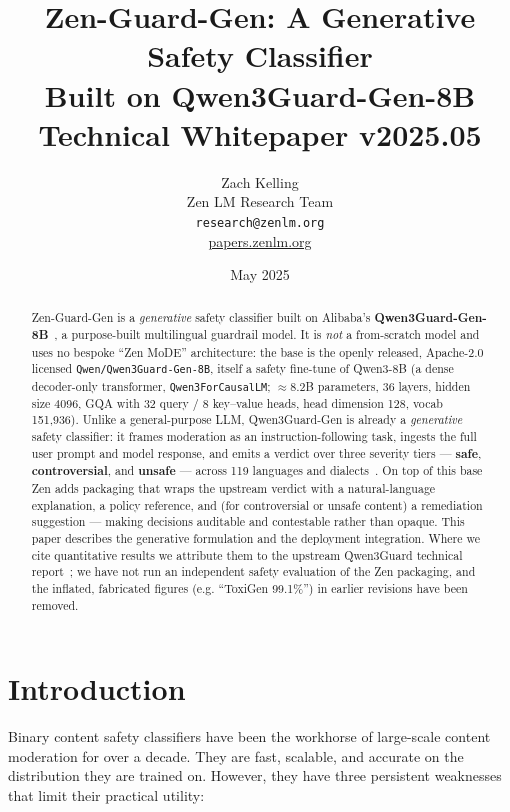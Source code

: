 \documentclass[11pt,a4paper]{article}
\title{\textbf{Zen-Guard-Gen: A Generative Safety Classifier\\
Built on Qwen3Guard-Gen-8B}\\[0.5em]
\large Technical Whitepaper v2025.05}
\author{Zach Kelling \\ Zen LM Research Team\\
\texttt{research@zenlm.org}\\
\href{https://papers.zenlm.org}{papers.zenlm.org}}
\date{May 2025}
\begin{document}
\maketitle

\begin{abstract}
Zen-Guard-Gen is a \emph{generative} safety classifier built on Alibaba's
\textbf{Qwen3Guard-Gen-8B}~\cite{qwen3guard}, a purpose-built multilingual guardrail model. It
is \emph{not} a from-scratch model and uses no bespoke ``Zen MoDE'' architecture: the base is
the openly released, Apache-2.0 licensed \texttt{Qwen/Qwen3Guard-Gen-8B}, itself a safety
fine-tune of Qwen3-8B (a dense decoder-only transformer, \texttt{Qwen3ForCausalLM};
$\approx$8.2B parameters, 36 layers, hidden size 4096, GQA with 32 query / 8 key--value heads,
head dimension 128, vocab 151{,}936). Unlike a general-purpose LLM, Qwen3Guard-Gen is already a
\emph{generative} safety classifier: it frames moderation as an instruction-following task,
ingests the full user prompt and model response, and emits a verdict over three severity tiers
--- \textbf{safe}, \textbf{controversial}, and \textbf{unsafe} --- across 119 languages and
dialects~\cite{qwen3guard}. On top of this base Zen adds packaging that wraps the upstream
verdict with a natural-language explanation, a policy reference, and (for controversial or
unsafe content) a remediation suggestion --- making decisions auditable and contestable rather
than opaque. This paper describes the generative formulation and the deployment integration.
Where we cite quantitative results we attribute them to the upstream Qwen3Guard technical
report~\cite{qwen3guard}; we have not run an independent safety evaluation of the Zen
packaging, and the inflated, fabricated figures (e.g. ``ToxiGen 99.1\%'') in earlier revisions
have been removed.
\end{abstract}

\tableofcontents
\newpage

\section{Introduction}

Binary content safety classifiers have been the workhorse of large-scale content moderation for over a decade. They are fast, scalable, and accurate on the distribution they are trained on. However, they have three persistent weaknesses that limit their practical utility:
\end{document}

